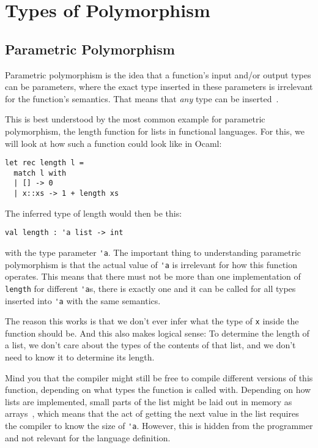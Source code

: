 \section{Types of Polymorphism}

\subsection{Parametric Polymorphism}

Parametric polymorphism is the idea that a function's input and/or output types can be parameters, where the exact type inserted in these parameters is irrelevant for the function's semantics. That means that \textit{any} type can be inserted~\cite[Chapter~23.2]{pierce-types}.

This is best understood by the most common example for parametric polymorphism, the length function for lists in functional languages. For this, we will look at how such a function could look like in Ocaml:
\newpage
\begin{verbatim}
let rec length l =
  match l with
  | [] -> 0
  | x::xs -> 1 + length xs
\end{verbatim}
The inferred type of length would then be this:
\begin{verbatim}
val length : 'a list -> int
\end{verbatim}
with the type parameter \verb|'a|. The important thing to understanding parametric polymorphism is that the actual value of \verb|'a| is irrelevant for how this function operates. This means that there must not be more than one implementation of \verb|length| for different \verb|'a|s, there is exactly one and it can be called for all types inserted into \verb|'a| with the same semantics.

The reason this works is that we don't ever infer what the type of \verb|x| inside the function should be. And this also makes logical sense: To determine the length of a list, we don't care about the types of the contents of that list, and we don't need to know it to determine its length.

Mind you that the compiler might still be free to compile different versions of this function, depending on what types the function is called with. Depending on how lists are implemented, small parts of the list might be laid out in memory as arrays~\cite{functional-lists}, which means that the act of getting the next value in the list requires the compiler to know the size of \verb|'a|. However, this is hidden from the programmer and not relevant for the language definition.

